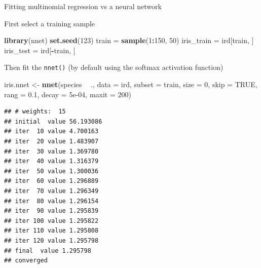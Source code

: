 \documentclass[10pt,ignorenonframetext,]{beamer}
\newenvironment{Shaded}{\begin{snugshade}}{\end{snugshade}}
\newcommand{\KeywordTok}[1]{\textcolor[rgb]{0.13,0.29,0.53}{\textbf{#1}}}
\newcommand{\DataTypeTok}[1]{\textcolor[rgb]{0.13,0.29,0.53}{#1}}
\newcommand{\DecValTok}[1]{\textcolor[rgb]{0.00,0.00,0.81}{#1}}
\newcommand{\FloatTok}[1]{\textcolor[rgb]{0.00,0.00,0.81}{#1}}
\newcommand{\StringTok}[1]{\textcolor[rgb]{0.31,0.60,0.02}{#1}}
\newcommand{\OtherTok}[1]{\textcolor[rgb]{0.56,0.35,0.01}{#1}}
\newcommand{\OperatorTok}[1]{\textcolor[rgb]{0.81,0.36,0.00}{\textbf{#1}}}
\newcommand{\NormalTok}[1]{#1}
\begin{document}
\begin{frame}[fragile]

\begin{block}{Fitting multinomial regression vs a neural network}

First select a training sample

\scriptsize

\begin{Shaded}
\begin{Highlighting}[]
\KeywordTok{library}\NormalTok{(nnet)}
\KeywordTok{set.seed}\NormalTok{(}\DecValTok{123}\NormalTok{)}
\NormalTok{train =}\StringTok{ }\KeywordTok{sample}\NormalTok{(}\DecValTok{1}\OperatorTok{:}\DecValTok{150}\NormalTok{, }\DecValTok{50}\NormalTok{)}
\NormalTok{iris_train =}\StringTok{ }\NormalTok{ird[train, ]}
\NormalTok{iris_test =}\StringTok{ }\NormalTok{ird[}\OperatorTok{-}\NormalTok{train, ]}
\end{Highlighting}
\end{Shaded}

\normalsize
Then fit the \texttt{nnet()} (by default using the softmax activation
function)

\scriptsize

\begin{Shaded}
\begin{Highlighting}[]
\NormalTok{iris.nnet <-}\StringTok{ }\KeywordTok{nnet}\NormalTok{(species }\OperatorTok{~}\StringTok{ }\NormalTok{., }\DataTypeTok{data =}\NormalTok{ ird, }\DataTypeTok{subset =}\NormalTok{ train, }\DataTypeTok{size =} \DecValTok{0}\NormalTok{, }
    \DataTypeTok{skip =} \OtherTok{TRUE}\NormalTok{, }\DataTypeTok{rang =} \FloatTok{0.1}\NormalTok{, }\DataTypeTok{decay =} \FloatTok{5e-04}\NormalTok{, }\DataTypeTok{maxit =} \DecValTok{200}\NormalTok{)}
\end{Highlighting}
\end{Shaded}

\begin{verbatim}
## # weights:  15
## initial  value 56.193086 
## iter  10 value 4.700163
## iter  20 value 1.483907
## iter  30 value 1.369780
## iter  40 value 1.316379
## iter  50 value 1.300036
## iter  60 value 1.296889
## iter  70 value 1.296349
## iter  80 value 1.296154
## iter  90 value 1.295839
## iter 100 value 1.295822
## iter 110 value 1.295808
## iter 120 value 1.295798
## final  value 1.295798 
## converged
\end{verbatim}

\end{block}

\end{frame}
\end{document}
